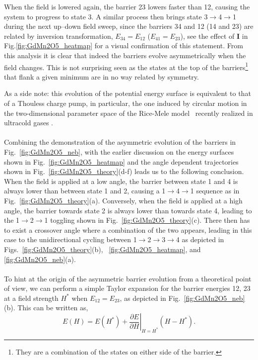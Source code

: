 When the field is lowered again, the barrier 23 lowers faster than 12, causing the system to progress to state 3.
A similar process then brings state 3$\rightarrow$4$\rightarrow$1 during the next up--down field sweep, since the barriers 34 and 12  (14 and 23) are related by inversion transformation,  $E_{34} = E_{12}$ ($E_{41} = E_{23}$), see the effect of {\bf I} in Fig.\ref{fig:GdMn2O5_heatmap} for a visual confirmation of this statement.
From this analysis it is clear that indeed the barriers evolve asymmetrically when the field changes.
This is not surprising seen as the states at the top of the barriers\footnote{They are a combination of the states on either side of the barrier.} that flank a given minimum are in no way related by symmetry.

As a side note: this evolution of the potential energy surface is equivalent to that of a Thouless charge pump, in particular, the one induced by circular motion in the two-dimensional parameter space of the Rice-Mele model~\cite{Rice82} recently realized in ultracold gases \cite{Lohse16,Nakajima16,Atala13}.
\\\\
Combining the demonstration of the asymmetric evolution of the barriers in Fig.~\ref{fig:GdMn2O5_neb}, with the earlier discussion on the energy surfaces shown in Fig.~\ref{fig:GdMn2O5_heatmap} and the angle dependent trajectories shown in Fig.~\ref{fig:GdMn2O5_theory}(d-f) leads us to the following conclusion.
When the field is applied at a low angle, the barrier between state 1 and 4 is always lower than between state 1 and 2, causing a 1$\rightarrow$4$\rightarrow$1 sequence as in Fig.~\ref{fig:GdMn2O5_theory}(a).
Conversely, when the field is applied at a high angle, the barrier towards state 2 is always lower than towards state 4, leading to the 1$\rightarrow$2$\rightarrow$1 toggling shown in Fig.~\ref{fig:GdMn2O5_theory}(c).
There then has to exist a crossover angle where a combination of the two appears, leading in this case to the unidirectional cycling between 1$\rightarrow$2$\rightarrow$3$\rightarrow$4 as depicted in Figs.~\ref{fig:GdMn2O5_theory}(b), ~\ref{fig:GdMn2O5_heatmap}, and \ref{fig:GdMn2O5_neb}(a).
\\\\
%
To hint at the origin of the asymmetric barrier evolution from a theoretical point of view, we can perform a simple Taylor expansion for the barrier energies 12, 23 at a field strength $H^*$ when $E_{12} = E_{23}$, as depicted in Fig.~\ref{fig:GdMn2O5_neb}(b).
This can be written as,
\begin{equation}
	E(H) = E(H^*) + \left.\frac{\partial E}{\partial H}\right|_{H=H^*}(H - H^*).
\end{equation}
